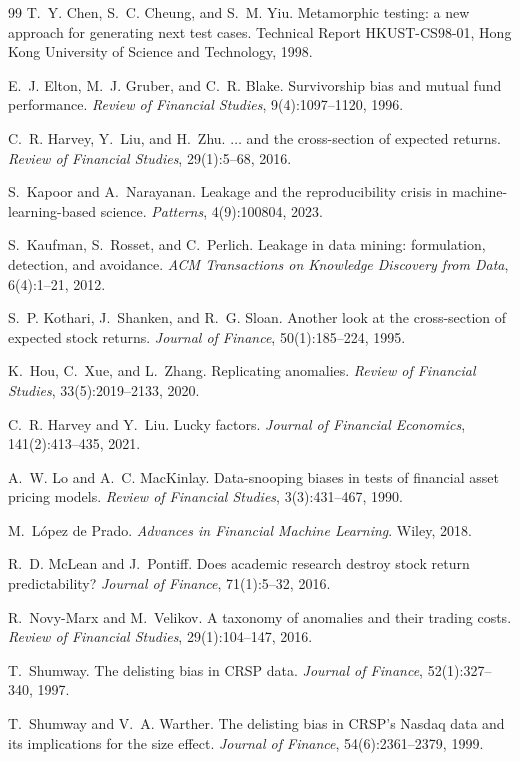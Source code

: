 \documentclass[11pt]{article}
\begin{document}
\begin{thebibliography}{99}
T.~Y. Chen, S.~C. Cheung, and S.~M. Yiu.
\newblock Metamorphic testing: a new approach for generating next test cases.
\newblock Technical Report HKUST-CS98-01, Hong Kong University of Science and
  Technology, 1998.

E.~J. Elton, M.~J. Gruber, and C.~R. Blake.
\newblock Survivorship bias and mutual fund performance.
\newblock \emph{Review of Financial Studies}, 9(4):1097--1120, 1996.

C.~R. Harvey, Y.~Liu, and H.~Zhu.
\newblock $\ldots$ and the cross-section of expected returns.
\newblock \emph{Review of Financial Studies}, 29(1):5--68, 2016.

S.~Kapoor and A.~Narayanan.
\newblock Leakage and the reproducibility crisis in machine-learning-based science.
\newblock \emph{Patterns}, 4(9):100804, 2023.

S.~Kaufman, S.~Rosset, and C.~Perlich.
\newblock Leakage in data mining: formulation, detection, and avoidance.
\newblock \emph{ACM Transactions on Knowledge Discovery from Data}, 6(4):1--21, 2012.

S.~P. Kothari, J.~Shanken, and R.~G. Sloan.
\newblock Another look at the cross-section of expected stock returns.
\newblock \emph{Journal of Finance}, 50(1):185--224, 1995.

K.~Hou, C.~Xue, and L.~Zhang.
\newblock Replicating anomalies.
\newblock \emph{Review of Financial Studies}, 33(5):2019--2133, 2020.

C.~R. Harvey and Y.~Liu.
\newblock Lucky factors.
\newblock \emph{Journal of Financial Economics}, 141(2):413--435, 2021.

A.~W. Lo and A.~C. MacKinlay.
\newblock Data-snooping biases in tests of financial asset pricing models.
\newblock \emph{Review of Financial Studies}, 3(3):431--467, 1990.

M.~L\'opez de Prado.
\newblock \emph{Advances in Financial Machine Learning}.
\newblock Wiley, 2018.

R.~D. McLean and J.~Pontiff.
\newblock Does academic research destroy stock return predictability?
\newblock \emph{Journal of Finance}, 71(1):5--32, 2016.

R.~Novy-Marx and M.~Velikov.
\newblock A taxonomy of anomalies and their trading costs.
\newblock \emph{Review of Financial Studies}, 29(1):104--147, 2016.

T.~Shumway.
\newblock The delisting bias in CRSP data.
\newblock \emph{Journal of Finance}, 52(1):327--340, 1997.

T.~Shumway and V.~A. Warther.
\newblock The delisting bias in CRSP's Nasdaq data and its implications for the
  size effect.
\newblock \emph{Journal of Finance}, 54(6):2361--2379, 1999.

\end{thebibliography}
\end{document}
